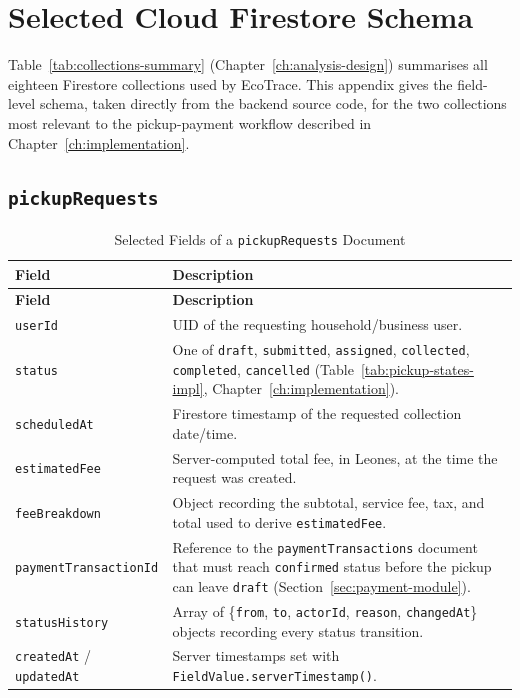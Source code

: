 \chapter{Selected Cloud Firestore Schema}
\label{app:schema}

Table~\ref{tab:collections-summary} (Chapter~\ref{ch:analysis-design})
summarises all eighteen Firestore collections used by EcoTrace. This
appendix gives the field-level schema, taken directly from the backend
source code, for the two collections most relevant to the pickup-payment
workflow described in Chapter~\ref{ch:implementation}.

\section{\texttt{pickupRequests}}

\begin{longtable}{@{}p{3.6cm}p{9.4cm}@{}}
\caption{Selected Fields of a \texttt{pickupRequests} Document} \label{tab:schema-pickup} \\
\toprule \textbf{Field} & \textbf{Description} \\ \midrule
\endfirsthead
\toprule \textbf{Field} & \textbf{Description} \\ \midrule
\endhead
\texttt{userId} & UID of the requesting household/business user. \\
\texttt{status} & One of \texttt{draft}, \texttt{submitted}, \texttt{assigned}, \texttt{collected}, \texttt{completed}, \texttt{cancelled} (Table~\ref{tab:pickup-states-impl}, Chapter~\ref{ch:implementation}). \\
\texttt{scheduledAt} & Firestore timestamp of the requested collection date/time. \\
\texttt{estimatedFee} & Server-computed total fee, in Leones, at the time the request was created. \\
\texttt{feeBreakdown} & Object recording the subtotal, service fee, tax, and total used to derive \texttt{estimatedFee}. \\
\texttt{paymentTransactionId} & Reference to the \texttt{paymentTransactions} document that must reach \texttt{confirmed} status before the pickup can leave \texttt{draft} (Section~\ref{sec:payment-module}). \\
\texttt{statusHistory} & Array of \{\texttt{from}, \texttt{to}, \texttt{actorId}, \texttt{reason}, \texttt{changedAt}\} objects recording every status transition. \\
\texttt{createdAt} / \texttt{updatedAt} & Server timestamps set with \texttt{FieldValue.serverTimestamp()}. \\
\bottomrule
\end{longtable}

